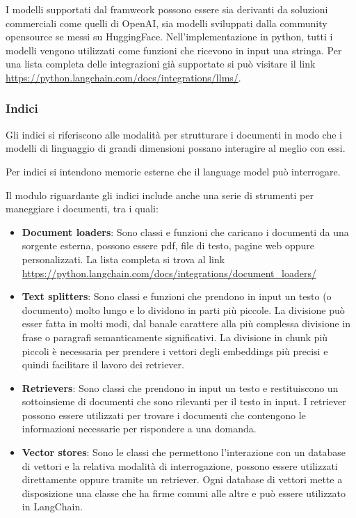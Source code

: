 I modelli supportati dal framweork possono essere sia derivanti da soluzioni commerciali come quelli di OpenAI, sia modelli sviluppati dalla community opensource se messi su HuggingFace.
Nell'implementazione in python, tutti i modelli vengono utilizzati come funzioni che ricevono in input una stringa.
Per una lista completa delle integrazioni già supportate si può visitare il link \url{https://python.langchain.com/docs/integrations/llms/}.

\subsubsection*{Indici}

Gli indici si riferiscono alle modalità per strutturare i documenti in modo che i modelli di linguaggio di grandi dimensioni possano interagire al meglio con essi.

Per indici si intendono memorie esterne che il language model può interrogare.

Il modulo riguardante gli indici include anche una serie di strumenti per maneggiare i documenti, tra i quali:

\begin{itemize}
    \item \textbf{Document loaders}: Sono classi e funzioni che caricano i documenti da una sorgente esterna, possono essere pdf, file di testo, pagine web oppure personalizzati. La lista completa si trova al link \url{https://python.langchain.com/docs/integrations/document_loaders/}
    \item \textbf{Text splitters}: Sono classi e funzioni che prendono in input un testo (o documento) molto lungo e lo dividono in parti più piccole. La divisione può esser fatta in molti modi, dal banale carattere alla più complessa divisione in frase o paragrafi semanticamente significativi. La divisione in chunk più piccoli è necessaria per prendere i vettori degli embeddings più precisi e quindi facilitare il lavoro dei retriever.
    \item \textbf{Retrievers}: Sono classi che prendono in input un testo e restituiscono un sottoinsieme di documenti che sono rilevanti per il testo in input. I retriever possono essere utilizzati per trovare i documenti che contengono le informazioni necessarie per rispondere a una domanda.
    \item \textbf{Vector stores}: Sono le classi che permettono l'interazione con un database di vettori e la relativa modalità di interrogazione, possono essere utilizzati direttamente oppure tramite un retriever. Ogni database di vettori mette a disposizione una classe che ha firme comuni alle altre e può essere utilizzato in LangChain.
\end{itemize}

